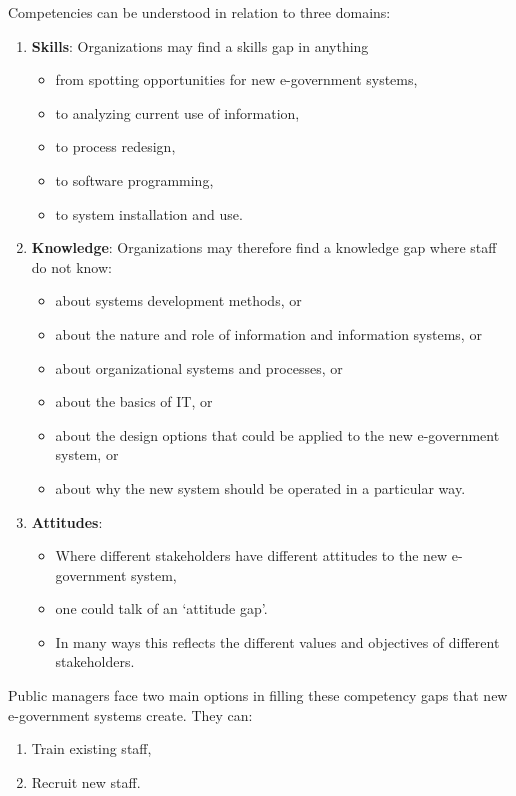 Competencies can be understood in relation to three domains:
\begin{enumerate}
	\item \textbf{Skills}: Organizations may find a skills gap in anything 
	\begin{itemize}
		\item from spotting opportunities for new e-government systems, 
		\item to analyzing current use of information, 
		\item to process redesign, 
		\item to software programming, 
		\item to system installation and use.
	\end{itemize}

	\item \textbf{Knowledge}: Organizations may therefore find a knowledge gap where staff do not know:
	
\begin{itemize}
	\item about systems development methods, or 
	\item about the nature and role of information and information systems, or 
	\item about organizational systems and processes, or 
	\item about	the basics of IT, or 
	\item about the design options that could be applied to the new e-government system, or 
	\item about why the new system should be operated in a particular way.
\end{itemize} 

\item \textbf{Attitudes}:
\begin{itemize}
	\item Where different stakeholders have different attitudes to the new e-government system, 
	\item one could talk of	an `attitude gap'. 
	\item In many ways this	reflects the different values and objectives of different stakeholders.
\end{itemize}
\end{enumerate}


Public managers face two main options in filling these competency gaps that new e-government systems create. They can:
\begin{enumerate}
	\item Train existing staff,
	\item Recruit new staff.
\end{enumerate} 


